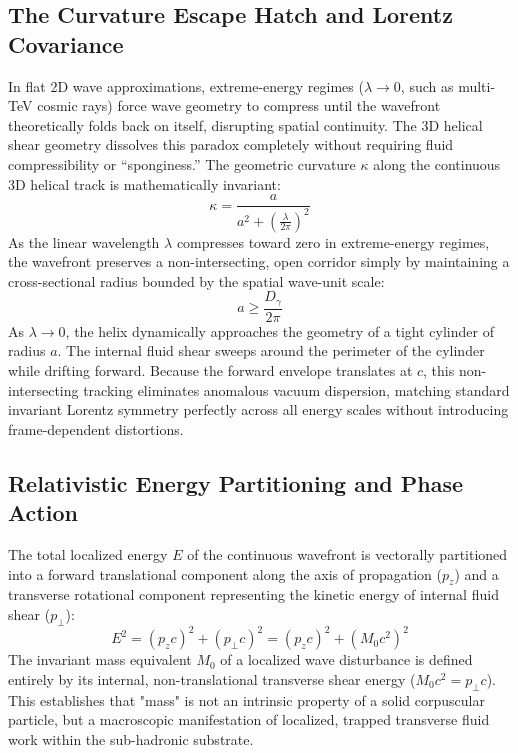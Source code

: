 \documentclass[11pt,a4paper]{article}
\begin{document}
	\subsection{The Curvature Escape Hatch and Lorentz Covariance}
	In flat 2D wave approximations, extreme-energy regimes ($\lambda \to 0$, such as multi-TeV cosmic rays) force wave geometry to compress until the wavefront theoretically folds back on itself, disrupting spatial continuity. The 3D helical shear geometry dissolves this paradox completely without requiring fluid compressibility or ``sponginess.'' The geometric curvature $\kappa$ along the continuous 3D helical track is mathematically invariant:
	\begin{equation}
		\kappa = \frac{a}{a^2 + \left(\frac{\lambda}{2\pi}\right)^2}
	\end{equation}
	As the linear wavelength $\lambda$ compresses toward zero in extreme-energy regimes, the wavefront preserves a non-intersecting, open corridor simply by maintaining a cross-sectional radius bounded by the spatial wave-unit scale:
	\begin{equation}
		a \ge \frac{D_\gamma}{2\pi}
	\end{equation}
	As $\lambda \to 0$, the helix dynamically approaches the geometry of a tight cylinder of radius $a$. The internal fluid shear sweeps around the perimeter of the cylinder while drifting forward. Because the forward envelope translates at $c$, this non-intersecting tracking eliminates anomalous vacuum dispersion, matching standard invariant Lorentz symmetry perfectly across all energy scales without introducing frame-dependent distortions.
	
	\subsection{Relativistic Energy Partitioning and Phase Action}
	The total localized energy $E$ of the continuous wavefront is vectorally partitioned into a forward translational component along the axis of propagation ($p_z$) and a transverse rotational component representing the kinetic energy of internal fluid shear ($p_\perp$):
	\begin{equation}
		E^2 = (p_z c)^2 + (p_\perp c)^2 = (p_z c)^2 + (M_0 c^2)^2
	\end{equation}
	The invariant mass equivalent $M_0$ of a localized wave disturbance is defined entirely by its internal, non-translational transverse shear energy ($M_0 c^2 = p_\perp c$). This establishes that "mass" is not an intrinsic property of a solid corpuscular particle, but a macroscopic manifestation of localized, trapped transverse fluid work within the sub-hadronic substrate.
	
\end{document}
